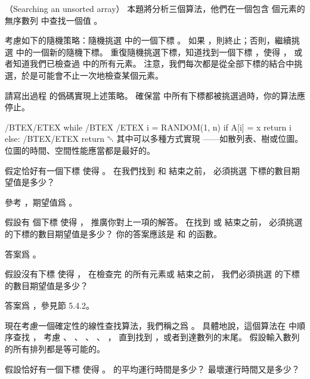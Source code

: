 \startPROBLEM（Searching an unsorted array）
本題將分析三個算法，他們在一個包含  個元素的無序數列  中查找一個值 。

考慮如下的隨機策略：隨機挑選  中的一個下標 。
如果 ，則終止；否則，繼續挑選  中的一個新的隨機下標。
重復隨機挑選下標，知道找到一個下標 ，使得 ，
或者知道我們已檢查過  中的所有元素。
注意，我們每次都是從全部下標的結合中挑選，於是可能會不止一次地檢查某個元素。
\startigBase[a]
\item 請寫出過程  的僞碼實現上述策略。
確保當  中所有下標都被挑選過時，你的算法應停止。
\stopigBase

\startANSWER
{}
\startCLRS
/BTEX/ETEX
while /BTEX  /ETEX
	i = RANDOM(1, n)
	if A[i] = x
		return i
	else:
		/BTEX/ETEX
return ␀
\stopCLRS
其中可以多種方式實現 ——如散列表、樹或位圖。位圖的時間、空間性能應當都是最好的。
\stopANSWER

\startigBase[continue]
\item 假定恰好有一個下標  使得 。
在我們找到  和  結束之前，
必須挑選  下標的數目期望值是多少？
\stopigBase

\startANSWER
參考 ，期望值爲 。
\stopANSWER

\startigBase[continue]
\item 假設有  個下標  使得 ，
推廣你對上一項的解答。
在找到  或  結束之前，
必須挑選  的下標的數目期望值是多少？
你的答案應該是  和  的函數。
\stopigBase

\startANSWER
答案爲 。
\stopANSWER

\startigBase[continue]
\item 假設沒有下標  使得 ，
在檢查完  的所有元素或  結束之前，
我們必須挑選  的下標的數目期望值是多少？
\stopigBase

\startANSWER
答案爲 ，參見節 5.4.2。
\stopANSWER

現在考慮一個確定性的線性查找算法，我們稱之爲 。
具體地說，這個算法在  中順序查找 ，
考慮 、 、 、 \m{\ldots}、 ，
直到找到 ，或者到達數列的末尾。
假設輸入數列的所有排列都是等可能的。
\startigBase[continue]
\item 假設恰好有一個下標  使得 。
 的平均運行時間是多少？
最壞運行時間又是多少？
\stopigBase

